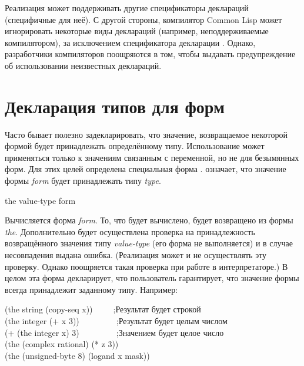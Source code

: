 Реализация может поддерживать другие спецификаторы деклараций (специфичные для
неё).
С другой стороны, компилятор Common Lisp может игнорировать некоторые виды
деклараций (например, неподдерживаемые компилятором), за исключением
спецификатора декларации .
Однако, разработчики компиляторов поощряются в том, чтобы выдавать
предупреждение об использовании неизвестных деклараций.

\section{Декларация типов для форм}

Часто бывает полезно задекларировать, что значение, возвращаемое некоторой
формой будет принадлежать определённому типу.
Использование  может применяться только к значениям связанным с
переменной, но не для безымянных форм. Для этих целей определена специальная
форма .   означает, что значение
формы \emph{form} будет принадлежать типу \emph{type}.

\begin{defspec}
the value-type form

Вычисляется форма \emph{form}. То, что будет вычислено, будет возвращено из
формы \emph{the}. Дополнительно будет осуществлена проверка на принадлежность
возвращённого значения типу \emph{value-type} (его форма не выполняется) и в
случае несовпадения выдана ошибка. (Реализация может и не осуществлять эту
проверку. Однако поощряется такая проверка при работе в интерпретаторе.) В целом
эта форма декларирует, что пользователь гарантирует, что значение формы всегда
принадлежит заданному типу.
Например:
\begin{lisp}
(the string (copy-seq x))~~~~~;\textrm{Результат будет строкой} \\
(the integer (+ x 3))~~~~~~~~~;\textrm{Результат \cdf{+} будет целым числом} \\
(+ (the integer x) 3)~~~~~~~~~;\textrm{Значением  будет целое число} \\
(the (complex rational) (* z 3)) \\
(the (unsigned-byte 8) (logand x mask))
\end{lisp}
\end{defspec}

\fi